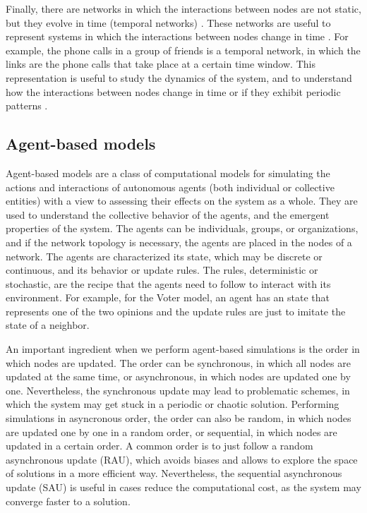 Finally, there are networks in which the interactions between nodes are not static, but they evolve in time (temporal networks) \cite{Holme2012Temporal}. These networks are useful to represent systems in which the interactions between nodes change in time \cite{Perra2012ActivityDriven}. For example, the phone calls in a group of friends is a temporal network, in which the links are the phone calls that take place at a certain time window. This representation is useful to study the dynamics of the system, and to understand how the interactions between nodes change in time \cite{karsai-2011} or if they exhibit periodic patterns \cite{Jo2012Circadian}.

\subsection{\label{subsec:Agent-based models} Agent-based models}

Agent-based models are a class of computational models for simulating the actions and interactions of autonomous agents (both individual or collective entities) with a view to assessing their effects on the system as a whole. They are used to understand the collective behavior of the agents, and the emergent properties of the system. The agents can be individuals, groups, or organizations, and if the network topology is necessary, the agents are placed in the nodes of a network. The agents are characterized its state, which may be discrete or continuous, and its behavior or update rules. The rules, deterministic or stochastic, are the recipe that the agents need to follow to interact with its environment. For example, for the Voter model, an agent has an state that represents one of the two opinions and the update rules are just to imitate the state of a neighbor.

An important ingredient when we perform agent-based simulations is the order in which nodes are updated. The order can be synchronous, in which all nodes are updated at the same time, or asynchronous, in which nodes are updated one by one. Nevertheless, the synchronous update may lead to problematic schemes, in which the system may get stuck in a periodic or chaotic solution. Performing simulations in asyncronous order, the order can also be random, in which nodes are updated one by one in a random order, or sequential, in which nodes are updated in a certain order. A common order is to just follow a random asynchronous update (RAU), which avoids biases and allows to explore the space of solutions in a more efficient way. Nevertheless, the sequential asynchronous update (SAU) is useful in cases reduce the computational cost, as the system may converge faster to a solution. 

